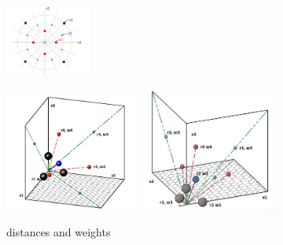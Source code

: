 \documentclass[11pt]{beamer}
\begin{document}
\begin{frame}
\begin{figure}[h]
	\centering
	\includegraphics[width=0.25\textwidth]{2dhscaledaxis.jpg}
\end{figure}

\begin{figure}[h]
	\centering
		\includegraphics[width=0.4\textwidth]{3dhscaledaxis.jpg}
			\includegraphics[width=0.4\textwidth]{3dhscaledaxis2.jpg}
	\caption{distances and weights}
\end{figure}
\end{frame}
\end{document}
